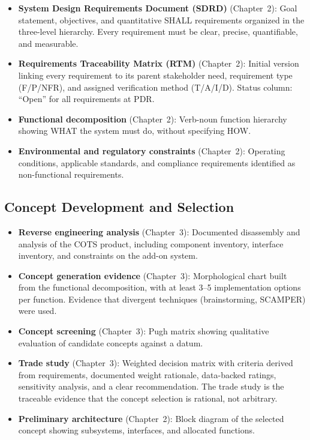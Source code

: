 \documentclass[11pt,letterpaper,twoside,openany]{book}
\begin{document}
\begin{itemize}[leftmargin=1.5em]
\item \textbf{System Design Requirements Document (SDRD)} (Chapter~2): Goal statement, objectives, and quantitative SHALL requirements organized in the three-level hierarchy. Every requirement must be clear, precise, quantifiable, and measurable.
\item \textbf{Requirements Traceability Matrix (RTM)} (Chapter~2): Initial version linking every requirement to its parent stakeholder need, requirement type (F/P/NFR), and assigned verification method (T/A/I/D). Status column: ``Open'' for all requirements at PDR.
\item \textbf{Functional decomposition} (Chapter~2): Verb-noun function hierarchy showing WHAT the system must do, without specifying HOW.
\item \textbf{Environmental and regulatory constraints} (Chapter~2): Operating conditions, applicable standards, and compliance requirements identified as non-functional requirements.
\end{itemize}

\subsection{Concept Development and Selection}

\begin{itemize}[leftmargin=1.5em]
\item \textbf{Reverse engineering analysis} (Chapter~3): Documented disassembly and analysis of the COTS product, including component inventory, interface inventory, and constraints on the add-on system.
\item \textbf{Concept generation evidence} (Chapter~3): Morphological chart built from the functional decomposition, with at least 3--5 implementation options per function. Evidence that divergent techniques (brainstorming, SCAMPER) were used.
\item \textbf{Concept screening} (Chapter~3): Pugh matrix showing qualitative evaluation of candidate concepts against a datum.
\item \textbf{Trade study} (Chapter~3): Weighted decision matrix with criteria derived from requirements, documented weight rationale, data-backed ratings, sensitivity analysis, and a clear recommendation. The trade study is the traceable evidence that the concept selection is rational, not arbitrary.
\item \textbf{Preliminary architecture} (Chapter~2): Block diagram of the selected concept showing subsystems, interfaces, and allocated functions.
\end{itemize}
\end{document}
